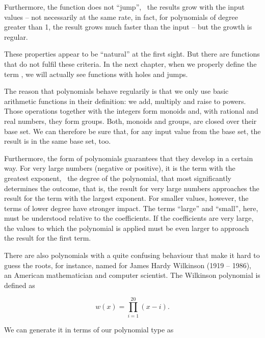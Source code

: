 \documentclass[tikz]{scrreprt}
\begin{document}
Furthermore, the function does not ``jump'', \ie\ the results
grow with the input values -- not necessarily
at the same rate, in fact, for polynomials of degree greater than 1,
the result grows much faster than the input -- but the growth
is regular.

These properties appear to be ``natural'' at the first sight.
But there are functions that do not fulfil these criteria.
In the next chapter, when we properly define the term ,
we will actually see functions with holes and jumps.

The reason that polynomials behave regularily is that we only
use basic arithmetic functions in their definition: we add, multiply
and raise to powers. 
Those operations together with the integers form monoids and,
with rational and real numbers, they form groups.
Both, monoids and groups, are closed over their base set.
We can therefore be sure that, for any input value from the base set,
the result is in the same base set, too.

Furthermore, the form of polynomials guarantees that they develop
in a certain way. For very large numbers (negative or positive), 
it is the term with the greatest exponent, \ie\ the degree 
of the polynomial, that most significantly determines the
outcome, that is, the result for very large numbers
approaches the result for the term with the largest exponent. 
For smaller values, however, the terms of lower degree have
stronger impact. The terms ``large'' and ``small'', here, 
must be understood relative to the coefficients. If the coefficients
are very large, the values to which the polynomial is applied
must be even larger to approach the result for the first term.

There are also polynomials with a quite confusing behaviour that
make it hard to guess the roots, for instance, 
named for James Hardy Wilkinson (1919 -- 1986), an American mathematician
and computer scientist. The Wilkinson polynomial is defined as

\begin{equation}
w(x) = \prod_{i=1}^{20}{(x-i)}.
\end{equation}

We can generate it in terms of our polynomial type as
\end{document}
